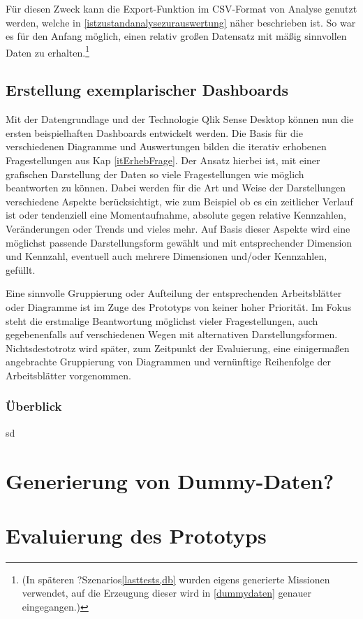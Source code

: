 Für diesen Zweck kann die Export-Funktion im CSV-Format von Analyse genutzt werden, welche in  \ref{istzustandanalysezurauswertung} näher beschrieben ist. 
So war es für den Anfang möglich, einen relativ großen Datensatz mit mäßig sinnvollen Daten zu erhalten.\footnote{(In späteren ?Szenarios\ref{lasttests,db} wurden eigens generierte Missionen verwendet, auf die Erzeugung dieser wird in \ref{dummydaten} genauer eingegangen.)}

\subsection{Erstellung exemplarischer Dashboards} 
Mit der Datengrundlage und der Technologie Qlik Sense Desktop können nun die ersten beispielhaften Dashboards entwickelt werden.
Die Basis für die verschiedenen Diagramme und Auswertungen bilden die iterativ erhobenen Fragestellungen aus Kap \ref{itErhebFrage}. 
Der Ansatz hierbei ist, mit einer grafischen Darstellung der Daten so viele Fragestellungen wie möglich beantworten zu können.
Dabei werden für die Art und Weise der Darstellungen verschiedene Aspekte berücksichtigt, wie zum Beispiel ob es ein zeitlicher Verlauf ist oder tendenziell eine Momentaufnahme, absolute gegen relative Kennzahlen, Veränderungen oder Trends und vieles mehr.
Auf Basis dieser Aspekte wird eine möglichst passende Darstellungsform gewählt und mit entsprechender Dimension und Kennzahl, eventuell auch mehrere Dimensionen und/oder Kennzahlen, gefüllt.

Eine sinnvolle Gruppierung oder Aufteilung der entsprechenden Arbeitsblätter oder Diagramme ist im Zuge des Prototyps von keiner hoher Priorität. 
Im Fokus steht die erstmalige Beantwortung möglichst vieler Fragestellungen, auch gegebenenfalls auf verschiedenen Wegen mit alternativen Darstellungsformen.
Nichtsdestotrotz wird später, zum Zeitpunkt der Evaluierung, eine einigermaßen angebrachte Gruppierung von Diagrammen und vernünftige Reihenfolge der Arbeitsblätter vorgenommen.

\subsubsection{Überblick}
sd

\section{Generierung von Dummy-Daten?}

\section{Evaluierung  des Prototyps}

